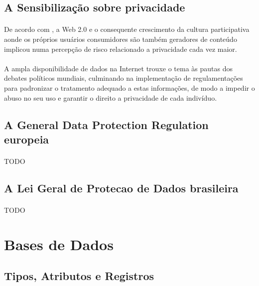 \subsection{A Sensibilização sobre privacidade}

\paragraph{} De acordo com \cite{lgpd-evandro}, a Web 2.0 e o consequente crescimento da cultura participativa
aonde os próprios usuários consumidores são também geradores de conteúdo implicou numa percepção de risco relacionado a privacidade cada vez maior.

\paragraph{} A ampla disponibilidade de dados na Internet trouxe o tema às pautas dos debates políticos 
mundiais, culminando na implementação de regulamentações para padronizar o tratamento adequado
a estas informações, de modo a impedir o abuso no seu uso e garantir o direito a privacidade de cada indivíduo.

\subsection{A General Data Protection Regulation europeia}

\paragraph{} TODO

\subsection{A Lei Geral de Protecao de Dados brasileira}

\paragraph{} TODO

\section{Bases de Dados}

\subsection{Tipos, Atributos e Registros}

